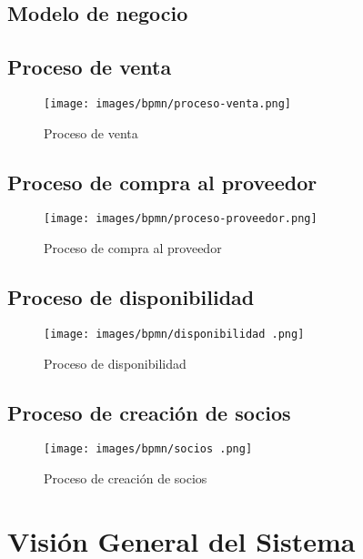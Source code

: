 \begin{landscape}
\section{Modelo de negocio}

\subsection{Proceso de venta}
\begin{figure}[H]
	\texttt{[image: images/bpmn/proceso-venta.png]}
	\caption{Proceso de venta}
\end{figure}
\subsection{Proceso de compra al proveedor}
\begin{figure}[H]
	\texttt{[image: images/bpmn/proceso-proveedor.png]}
	\caption{Proceso de compra al proveedor}
\end{figure}

\subsection{Proceso de disponibilidad}
\begin{figure}[H]
	\texttt{[image: images/bpmn/disponibilidad .png]}
	\caption{Proceso de disponibilidad}
\end{figure}

\subsection{Proceso de creación de socios}
\begin{figure}[H]
	\texttt{[image: images/bpmn/socios .png]}
	\caption{Proceso de creación de socios}
\end{figure}
\end{landscape}

\section{Visión General del Sistema}
